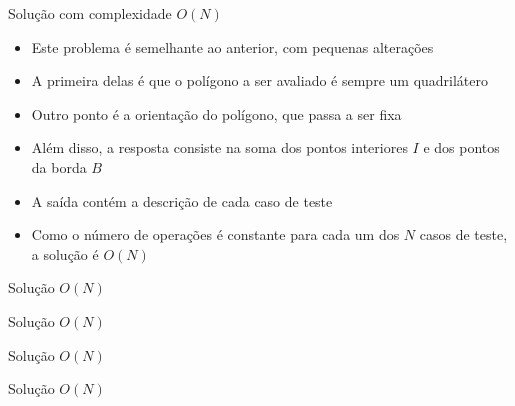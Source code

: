 \begin{frame}[fragile]{Solução com complexidade $O(N)$}

    \begin{itemize}
        \item Este problema é semelhante ao anterior, com pequenas alterações

        \item A primeira delas é que o polígono a ser avaliado é sempre um quadrilátero

        \item Outro ponto é a orientação do polígono, que passa a ser fixa 

        \item Além disso, a resposta consiste na soma dos pontos interiores $I$ e dos pontos
            da borda $B$

        \item A saída contém a descrição de cada caso de teste

        \item Como o número de operações é constante para cada um dos $N$ casos de teste,
            a solução é $O(N)$
   \end{itemize}

\end{frame}

\begin{frame}[fragile]{Solução $O(N)$}
\end{frame}

\begin{frame}[fragile]{Solução $O(N)$}
\end{frame}

\begin{frame}[fragile]{Solução $O(N)$}
\end{frame}

\begin{frame}[fragile]{Solução $O(N)$}
\end{frame}
